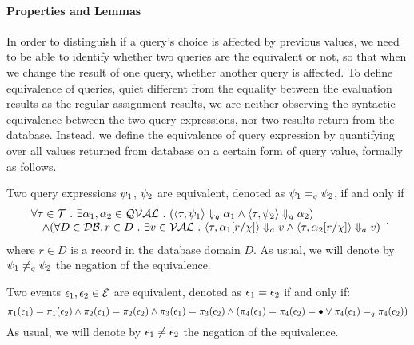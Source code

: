 \paragraph*{Properties and Lemmas}

In order to distinguish if a query's choice is affected by previous values, 
we need to be able to identify whether two queries are the equivalent or not, so that when we change the result of one query, 
whether another query is affected. 
To define equivalence of queries,
quiet different from the equality between the evaluation results as the regular assignment results, 
we are neither observing the syntactic equivalence between the two query expressions,
nor two results return from the database. 
Instead, we define the equivalence of query expression by quantifying over all values returned from database on a certain form of query value, formally as follows.

\begin{defn}
%
\label{def:query_equal}
Two query expressions $\psi_1$, $\psi_2$ are equivalent, denoted as $\psi_1 =_{q} \psi_2$, if and only if
$$
 \begin{array}{l} 
   \forall \mathtt{\tau} \in \mathcal{T} ~.~ \exists \alpha_1, \alpha_2 \in \mathcal{QVAL} ~.~
    (\langle \mathtt{\tau},  \psi_1 \rangle \Downarrow_q \alpha_1 \land \langle \mathtt{\tau},  \psi_2  \rangle \Downarrow_q \alpha_2) 
    \\
    \quad \land (\forall D \in \mathcal{DB}, r \in D ~.~ 
    \exists v \in \mathcal{VAL} ~.~ 
          \langle \mathtt{\tau}, \alpha_1[r/\chi] \rangle \Downarrow_a v \land \langle \mathtt{\tau},  \alpha_2[r/\chi]  \rangle \Downarrow_a v)  
  \end{array}.
$$
 where $r \in D$ is a record in the database domain $D$. 
 As usual, we will denote by $\psi_1 \neq_{q} \psi_2$  the negation of the equivalence.
\end{defn}
%
\begin{defn}
  Two events $\mathtt{\epsilon}_1, \mathtt{\epsilon}_2 \in \mathcal{E}$ are equivalent, 
  denoted as $\mathtt{\epsilon}_1 = \mathtt{\epsilon}_2$ 
  if and only if:
  \[
  \pi_1(\mathtt{\epsilon}_1) = \pi_1(\mathtt{\epsilon}_2) 
  \land  
  \pi_2(\mathtt{\epsilon}_1) = \pi_2(\mathtt{\epsilon}_2) 
  \land
  \pi_{3}(\mathtt{\epsilon}_1) = \pi_{3}(\mathtt{\epsilon}_2)
  \land 
  (\pi_{4}(\mathtt{\epsilon}_1) = \pi_{4}(\mathtt{\epsilon}_2) = \bullet
  \lor \pi_{4}(\mathtt{\epsilon}_1) =_q \pi_{4}(\mathtt{\epsilon}_2))
  \]
  As usual, we will denote by $\mathtt{\epsilon}_1 \neq \mathtt{\epsilon}_2$  the negation of the equivalence.
\end{defn}


